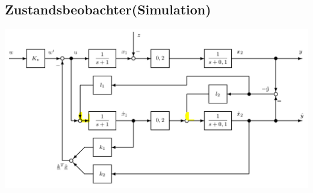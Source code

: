 \documentclass[fs, footer]{latex4ei}
\begin{document}
\begin{multicols*}{4}
\subsection{Zustandsbeobachter(Simulation)}
\includegraphics[width = 14cm]{./img/beobachter.jpg}


\end{multicols*}


\end{document}
